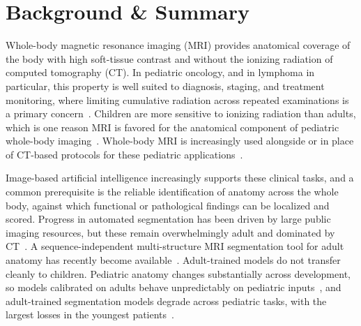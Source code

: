 
\section*{Background \& Summary}\label{sec:background}

Whole-body magnetic resonance imaging (MRI) provides anatomical coverage of the body with high soft-tissue contrast and without the ionizing radiation of computed tomography (CT).
In pediatric oncology, and in lymphoma in particular, this property is well suited to diagnosis, staging, and treatment monitoring, where limiting cumulative radiation across repeated examinations is a primary concern~\cite{GalloBernal_2025,Kurch_2021}.
Children are more sensitive to ionizing radiation than adults, which is one reason MRI is favored for the anatomical component of pediatric whole-body imaging~\cite{Brenner_2007}.
Whole-body MRI is increasingly used alongside or in place of CT-based protocols for these pediatric applications~\cite{Masselli_2025}.

Image-based artificial intelligence increasingly supports these clinical tasks, and a common prerequisite is the reliable identification of anatomy across the whole body, against which functional or pathological findings can be localized and scored.
Progress in automated segmentation has been driven by large public imaging resources, but these remain overwhelmingly adult and dominated by CT~\cite{Wasserthal_2023}.
A sequence-independent multi-structure MRI segmentation tool for adult anatomy has recently become available~\cite{Wasserthal_2025}.
Adult-trained models do not transfer cleanly to children.
Pediatric anatomy changes substantially across development, so models calibrated on adults behave unpredictably on pediatric inputs~\cite{Chatterjee_2025}, and adult-trained segmentation models degrade across pediatric tasks, with the largest losses in the youngest patients~\cite{Laborie_2026}.

